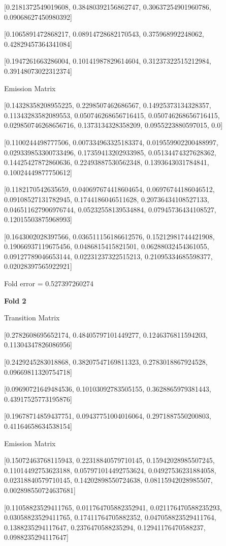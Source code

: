 \documentclass{article}
\begin{document}
[0.2181372549019608, 0.38480392156862747, 0.30637254901960786, 0.09068627450980392]

[0.1065891472868217, 0.08914728682170543, 0.375968992248062, 0.42829457364341084]

[0.1947261663286004, 0.10141987829614604, 0.31237322515212984, 0.39148073022312374]

Emission Matrix

[0.14328358208955225, 0.2298507462686567, 0.14925373134328357, 0.11343283582089553, 0.050746268656716415, 0.050746268656716415, 0.029850746268656716, 0.1373134328358209, 0.0955223880597015, 0.0]

[0.1100244498777506, 0.007334963325183374, 0.019559902200488997, 0.029339853300733496, 0.17359413202933985, 0.05134474327628362, 0.14425427872860636, 0.22493887530562348, 0.1393643031784841, 0.10024449877750612]

[0.1182170542635659, 0.040697674418604654, 0.06976744186046512, 0.09108527131782945, 0.1744186046511628, 0.20736434108527133, 0.046511627906976744, 0.05232558139534884, 0.07945736434108527, 0.12015503875968993]

[0.1643002028397566, 0.036511156186612576, 0.15212981744421908, 0.19066937119675456, 0.0486815415821501, 0.06288032454361055, 0.09127789046653144, 0.02231237322515213, 0.21095334685598377, 0.02028397565922921]

Fold error = 0.527397260274

\textbf{Fold 2}

Transition Matrix

[0.2782608695652174, 0.48405797101449277, 0.1246376811594203, 0.11304347826086956]

[0.2429245283018868, 0.38207547169811323, 0.2783018867924528, 0.09669811320754718]

[0.09690721649484536, 0.10103092783505155, 0.3628865979381443, 0.43917525773195876]

[0.19678714859437751, 0.09437751004016064, 0.2971887550200803, 0.41164658634538154]

Emission Matrix

[0.15072463768115943, 0.22318840579710145, 0.15942028985507245, 0.11014492753623188, 0.057971014492753624, 0.04927536231884058, 0.02318840579710145, 0.14202898550724638, 0.08115942028985507, 0.002898550724637681]

[0.11058823529411765, 0.011764705882352941, 0.021176470588235293, 0.03058823529411765, 0.17411764705882352, 0.047058823529411764, 0.1388235294117647, 0.2376470588235294, 0.12941176470588237, 0.0988235294117647]
\end{document}
